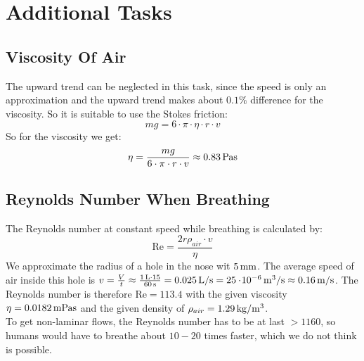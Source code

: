 \section{Additional Tasks}
\subsection{Viscosity Of Air}
The upward trend can be neglected in this task, since the speed is only an approximation and the upward trend makes about $0.1\%$ difference for the viscosity. So it is suitable to use the Stokes friction:
\begin{equation*}
mg = 6 \cdot \pi \cdot \eta \cdot r \cdot v
\end{equation*}
So for the viscosity we get:
\begin{equation}
\eta = \frac{mg}{6 \cdot \pi \cdot r \cdot v} \approx \unit[0.83]{Pa s}
\end{equation}

\subsection{Reynolds Number When Breathing}
The Reynolds number at constant speed while breathing is calculated by:
\begin{equation}
\text{Re} = \frac{2r \rho_{air} \cdot v}{\eta}
\end{equation}
We approximate the radius of a hole in the nose wit $\unit[5]{mm}$. The average speed of air inside this hole is $v = \frac{V}{t} \approx \frac{\unit[1]{L} \cdot 15}{\unit[60]{s}} = \unit[0.025]{L/s} = \unit[25\e{-6}]{m^3/s} \approx \unit[0.16]{m/s}$. The Reynolds number is therefore $\text{Re} = 113.4$ with the given viscosity $\eta = \unit[0.0182]{mPa s}$ and the given density of $\rho_{air} = \unit[1.29]{kg/m^3}$.\\
To get non-laminar flows, the Reynolds number has to be at last $>1160$, so humans would have to breathe about $10-20$ times faster, which we do not think is possible.